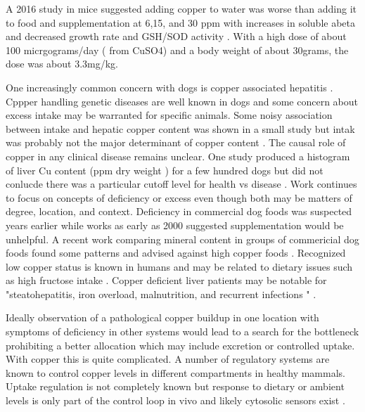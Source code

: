 \documentclass[aps,secnumarabic,balancelastpage,amsmath,amssymb,nofootinbib]{revtex4}
\begin{document}
A 2016 study in mice suggested adding copper to water was
worse than adding it to food and supplementation at 6,15, and 30 ppm
with increases in soluble abeta and decreased growth rate and
GSH/SOD activity
\cite{Wu_Han_Gong_effect_copper_2016}.
With a high dose of about 100 micrgograms/day ( from CuSO4) and
a body weight of about 30grams, the dose was about 3.3mg/kg.




One increasingly common concern with dogs is copper associated
hepatitis
\cite{10.1093/tas/txad147}
\cite{PMC10787350}
\cite{Center_Richter_Twedt_time_2021}.
Cppper handling genetic diseases  are well known in dogs 
\cite{PMC6531654} and some concern  about excess intake may be warranted
for specific animals. 
Some noisy association between intake and hepatic copper
content was shown in a small study
\cite{Fieten_HooijerNouwens_Biourge_Association_Dietary_Copper_2012}
but intak  was probably not the major determinant of copper content
.
The causal role of copper in any clinical disease remains unclear. 
One study produced a histogram of liver Cu content (ppm dry weight )
for a few hundred dogs but did not conlucde there was a particular
cutoff level for health vs disease
\cite{Thornburg_Rottinghaus_McGowan_Hepatic_Copper_Concentrations_1990}.
Work continues to focus on concepts of deficiency or
excess even though both may be matters of degree, location,  and context. 
 Deficiency   in commercial dog foods was    suspected years
earlier  \cite{HuberTLa}
while works as early as 2000 suggested supplementation
would be unhelpful\cite{doi:10.1177/104063870001200201}.
A recent work comparing mineral content in groups of commericial
dog foods found some patterns and advised against high copper
foods  
\cite{KUx0119badchar_Biel_Witkowicz_Mineral_heavy_metal_2023}.
Recognized low copper status is  known in humans
and may be related to dietary issues such as  
high fructose intake \cite{PMID7825519}. 
Copper deficient liver patients 
may be  notable for
"steatohepatitis, iron overload, malnutrition, and recurrent infections "
\cite{Yu_Liou_Biggins_Copper_Deficiency_Liver_2019}.

Ideally observation of a pathological copper 
buildup in one location with symptoms of deficiency
in other systems would lead to a search for 
the bottleneck prohibiting a better allocation which may
include excretion or controlled uptake.
With copper this is quite complicated. 
A number of regulatory systems are known to control
copper levels in different compartments  in healthy mammals.
Uptake regulation is not completely known but response to
dietary or ambient levels is only part of the control
loop in vivo and likely cytosolic sensors exist \cite{PMC6365104}.
\end{document}
